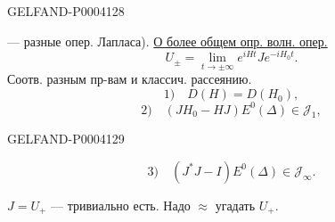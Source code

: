 \begin{GelfandAdjacentEvidence}{GELFAND-P000412}{8}


— разные опер. Лапласа).
\underline{О более общем опр. волн. опер.}
\begingroup\color{black}\begin{equation*}
U_\pm=\lim_{t\to\pm\infty}e^{iHt}Je^{-iH_0t}.
\end{equation*}\endgroup
Соотв. разным пр-вам и классич. рассеянию.
\begingroup\color{black}\begin{equation*}
1)\quad D(H)=D(H_0),
\end{equation*}\endgroup
\begingroup\color{black}\begin{equation*}
2)\quad(JH_0-HJ)E^0(\Delta)\in\mathcal J_1,
\end{equation*}\endgroup
{}
\end{GelfandAdjacentEvidence}
\begin{GelfandAdjacentEvidence}{GELFAND-P000412}{9}


\begingroup\color{black}\begin{equation*}
3)\quad(J^*J-I)E^0(\Delta)\in\mathcal J_\infty.
\end{equation*}\endgroup
{}
\end{GelfandAdjacentEvidence}


$J=U_+$ — тривиально есть.
Надо $\approx$ угадать $U_+$.



